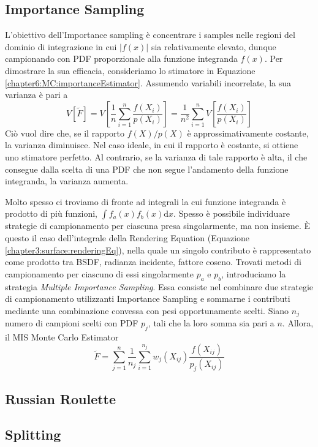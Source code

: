 \subsection{Importance Sampling}
L'obiettivo dell'Importance sampling \`e concentrare i samples nelle regioni del dominio di integrazione in cui $|f(x)|$ sia relativamente elevato, 
dunque campionando con PDF proporzionale alla funzione integranda $f(x)$. Per dimostrare la sua efficacia, consideriamo lo stimatore in 
Equazione \ref{chapter6:MC:importanceEstimator}. Assumendo variabili incorrelate, la sua varianza \`e pari a
\begin{equation}
	V[\tilde{F}]=V\left[\frac{1}{n}\sum_{i=1}^n\frac{f(X_i)}{p(X_i)}\right]=\frac{1}{n^2}\sum_{i=1}^nV\left[\frac{f(X_i)}{p(X_i)}\right]
\end{equation}
Ci\`o vuol dire che, se il rapporto $f(X)/p(X)$ \`e approssimativamente costante, la varianza diminuisce. Nel caso ideale, in cui il rapporto \`e 
costante, si ottiene uno stimatore perfetto. Al contrario, se la varianza di tale rapporto \`e alta, il che consegue dalla scelta di una PDF che 
non segue l'andamento della funzione integranda, la varianza aumenta.\par
Molto spesso ci troviamo di fronte ad integrali la cui funzione integranda \`e prodotto di pi\`u funzioni, $\int f_a(x)f_b(x)\mathrm{d}x$. Spesso
\`e possibile individuare strategie di campionamento per ciascuna presa singolarmente, ma non insieme. \`E questo il caso dell'integrale della 
Rendering Equation (Equazione \ref{chapter3:surface:renderingEq}), nella quale un singolo contributo \`e rappresentato come prodotto tra BSDF, 
radianza incidente, fattore coseno. Trovati metodi di campionamento per ciascuno di essi singolarmente $p_a$ e $p_b$, introduciamo la strategia
\textit{Multiple Importance Sampling}. Essa consiste nel combinare due strategie di campionamento utilizzanti Importance Sampling e sommarne i 
contributi mediante una combinazione convessa con pesi opportunamente scelti. Siano $n_j$ numero di campioni scelti con PDF $p_j$, tali che la loro
somma sia pari a $n$. Allora, il MIS Monte Carlo Estimator
\begin{equation}
	\tilde{F}=\sum_{j=1}^n\frac{1}{n_j}\sum_{i=1}^{n_j}w_j(X_{ij})\frac{f(X_{ij})}{p_j(X_{ij})}
\end{equation}
\subsection{Russian Roulette}
\subsection{Splitting}
